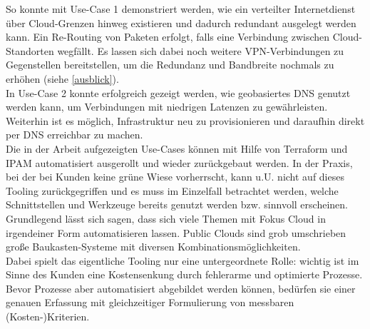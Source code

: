 So konnte mit Use-Case 1 demonstriert werden, wie ein verteilter Internetdienst über Cloud-Grenzen hinweg existieren und dadurch redundant ausgelegt werden kann. Ein Re-Routing von Paketen erfolgt, falls eine Verbindung zwischen Cloud-Standorten wegfällt. Es lassen sich dabei noch weitere VPN-Verbindungen zu Gegenstellen bereitstellen, um die Redundanz und Bandbreite nochmals zu erhöhen (siehe \ref{ausblick}).\\
In Use-Case 2 konnte erfolgreich gezeigt werden, wie geobasiertes DNS genutzt werden kann, um Verbindungen mit niedrigen Latenzen zu gewährleisten. Weiterhin ist es möglich, Infrastruktur neu zu provisionieren und daraufhin direkt per DNS erreichbar zu machen.\\ 
Die in der Arbeit aufgezeigten Use-Cases können mit Hilfe von Terraform und IPAM automatisiert ausgerollt und wieder zurückgebaut werden. In der Praxis, bei der bei Kunden keine \glqq grüne Wiese\grqq{} vorherrscht, kann u.U. nicht auf dieses Tooling zurückgegriffen und es muss im Einzelfall betrachtet werden, welche Schnittstellen und Werkzeuge bereits genutzt werden bzw. sinnvoll erscheinen. Grundlegend lässt sich sagen, dass sich viele Themen mit Fokus Cloud in irgendeiner Form automatisieren lassen. Public Clouds sind grob umschrieben große \glqq Baukasten-Systeme\grqq{} mit diversen Kombinationsmöglichkeiten.\\
Dabei spielt das eigentliche Tooling nur eine untergeordnete Rolle: wichtig ist im Sinne des Kunden eine Kostensenkung durch fehlerarme und optimierte Prozesse. Bevor Prozesse aber automatisiert abgebildet werden können, bedürfen sie einer genauen Erfassung mit gleichzeitiger Formulierung von messbaren (Kosten-)Kriterien.%


